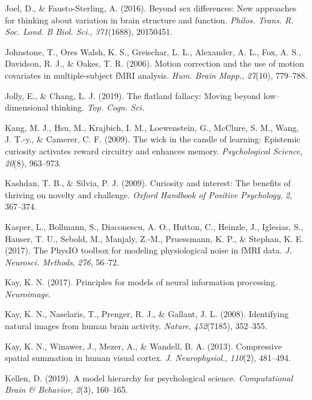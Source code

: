\documentclass[11pt,american,a4paper,oneside,]{memoir} %
\begin{document}
\leavevmode\hypertarget{ref-Joel2016-uo}{}%
Joel, D., \& Fausto-Sterling, A. (2016). Beyond sex differences: New approaches for thinking about variation in brain structure and function. \emph{Philos. Trans. R. Soc. Lond. B Biol. Sci.}, \emph{371}(1688), 20150451.

\leavevmode\hypertarget{ref-Johnstone2006-tn}{}%
Johnstone, T., Ores Walsh, K. S., Greischar, L. L., Alexander, A. L., Fox, A. S., Davidson, R. J., \& Oakes, T. R. (2006). Motion correction and the use of motion covariates in multiple-subject fMRI analysis. \emph{Hum. Brain Mapp.}, \emph{27}(10), 779--788.

\leavevmode\hypertarget{ref-Jolly2019-lx}{}%
Jolly, E., \& Chang, L. J. (2019). The flatland fallacy: Moving beyond low--dimensional thinking. \emph{Top. Cogn. Sci.}

\leavevmode\hypertarget{ref-kang2009wick}{}%
Kang, M. J., Hsu, M., Krajbich, I. M., Loewenstein, G., McClure, S. M., Wang, J. T.-y., \& Camerer, C. F. (2009). The wick in the candle of learning: Epistemic curiosity activates reward circuitry and enhances memory. \emph{Psychological Science}, \emph{20}(8), 963--973.

\leavevmode\hypertarget{ref-kashdan2009curiosity}{}%
Kashdan, T. B., \& Silvia, P. J. (2009). Curiosity and interest: The benefits of thriving on novelty and challenge. \emph{Oxford Handbook of Positive Psychology}, \emph{2}, 367--374.

\leavevmode\hypertarget{ref-Kasper2017-lp}{}%
Kasper, L., Bollmann, S., Diaconescu, A. O., Hutton, C., Heinzle, J., Iglesias, S., Hauser, T. U., Sebold, M., Manjaly, Z.-M., Pruessmann, K. P., \& Stephan, K. E. (2017). The PhysIO toolbox for modeling physiological noise in fMRI data. \emph{J. Neurosci. Methods}, \emph{276}, 56--72.

\leavevmode\hypertarget{ref-Kay2017-vr}{}%
Kay, K. N. (2017). Principles for models of neural information processing. \emph{Neuroimage}.

\leavevmode\hypertarget{ref-kay2008identifying}{}%
Kay, K. N., Naselaris, T., Prenger, R. J., \& Gallant, J. L. (2008). Identifying natural images from human brain activity. \emph{Nature}, \emph{452}(7185), 352--355.

\leavevmode\hypertarget{ref-Kay2013-ch}{}%
Kay, K. N., Winawer, J., Mezer, A., \& Wandell, B. A. (2013). Compressive spatial summation in human visual cortex. \emph{J. Neurophysiol.}, \emph{110}(2), 481--494.

\leavevmode\hypertarget{ref-Kellen2019-af}{}%
Kellen, D. (2019). A model hierarchy for psychological science. \emph{Computational Brain \& Behavior}, \emph{2}(3), 160--165.
\end{document}
